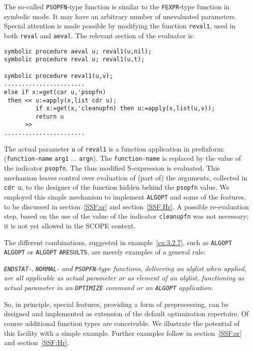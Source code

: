 The so-called {\tt PSOPFN}-type function is similar to the {\tt FEXPR}-type 
function in symbolic mode. It may have an arbitrary number of unevaluated
parameters.
Special attention is made possible by modifying the function {\tt reval1}, used
in both {\tt reval} and {\tt aeval}. The relevant section of the evaluator is:
{\small
\begin{verbatim}
symbolic procedure aeval u; reval1(u,nil);
symbolic procedure reval u; reval1(u,t);

symbolic procedure reval1(u,v);
.......................
else if x:=get(car u,'psopfn)
 then << u:=apply(x,list cdr u);
         if x:=get(x,'cleanupfn) then u:=apply(x,list(u,v));
         return u
      >>
.......................
\end{verbatim}}
The actual parameter {\tt u} of {\tt reval1} is a function application in
prefixform: ({\tt function-name} {\tt arg1} ... {\tt argn}). 
The {\tt function-name} is replaced by the value of the indicator {\tt psopfn}.
The thus modified S-expression is evaluated. This mechanism leaves control
over evaluation of (part of) the arguments, collected in {\tt cdr u}, to the
designer of the function hidden behind the {\tt psopfn} value. We employed
this simple mechanism to implement {\tt ALGOPT} and some of the features,
to be discussed in section~\ref{SSF:sr} and section~\ref{SSF:Hr}.
A possible re-evaluation step, based on the use of the
value of the indicator {\tt cleanupfn} was not necessary; it is not yet 
allowed in the SCOPE context.

The different combinations, suggested in example~\ref{ex:3.2.7}, such as
{\tt ALGOPT} {\tt ALGOPT} or {\tt ALGOPT} {\tt ARESULTS}, are merely examples 
of a general rule:

{\em {\tt ENDSTAT}-, {\tt NORMAL}- and {\tt PSOPFN}-type functions, delivering
an alglist when applied, are all applicable as actual parameter or
as element of an alglist, functioning as actual parameter in an
{\tt OPTIMIZE} command or an {\tt ALGOPT} application. }

So, in principle, special features, providing a form of preprocessing, can be
designed and implemented as extension of the default optimization repertoire.
Of course additional function types are conceivable.
We illustrate the potential of this facility with a simple example. 
Further examples follow
in section~\ref{SSF:sr} and section~\ref{SSF:Hr}. 

